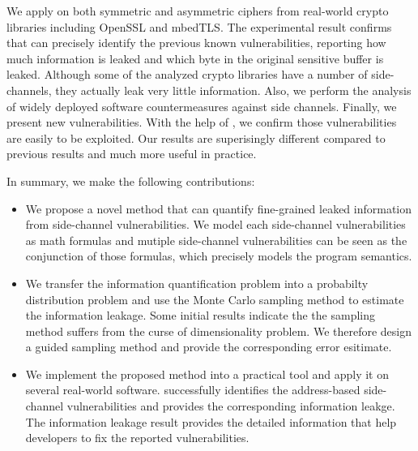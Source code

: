 We apply \tool{} on both symmetric and asymmetric ciphers from real-world crypto libraries including OpenSSL and
mbedTLS. The experimental result confirms that \tool{} can precisely identify the previous known vulnerabilities,
reporting how much information is leaked and which byte in the original sensitive buffer is leaked. 
Although some of the analyzed crypto libraries have a number of side-channels, they actually
leak very little information. Also, we perform the analysis of widely deployed software countermeasures
against side channels.
Finally, we present new vulnerabilities. With the help of \tool{}, we confirm those
vulnerabilities are easily to be exploited. Our results are superisingly different compared to previous results
and much more useful in practice.

In summary, we make the following contributions:

\begin{itemize}
	\item We propose a novel method that can quantify fine-grained leaked information from side-channel
        vulnerabilities. We model each side-channel vulnerabilities as math formulas and 
        mutiple side-channel vulnerabilities can be seen as the conjunction of those formulas, which
        precisely models the program semantics.
        \item We transfer the information quantification problem into a probabilty distribution problem and 
        use the Monte Carlo sampling method to estimate the information leakage. Some initial results indicate the 
        the sampling method suffers from the curse of dimensionality problem. We therefore design a guided
        sampling method and provide the corresponding error esitimate.
	\item We implement the proposed method into a practical tool and apply it on several real-world software. \tool{} 
        successfully identifies the address-based side-channel vulnerabilities and provides the corresponding
        information leakge. The information leakage result provides the detailed information that help developers to
        fix the reported vulnerabilities.
\end{itemize}

